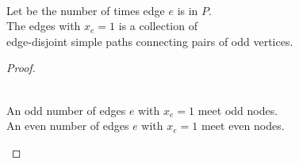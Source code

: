 \begin{frame}
  \begin{lemma}
    \begin{center}
       \\[5pt]
      Let  be the number of times edge $e$ is in $P$. \\[8pt]

      The edges with $x_e = 1$ is a collection of \\ edge-disjoint simple paths connecting pairs of odd vertices.
    \end{center}
  \end{lemma}

  \pause
  \begin{proof}
    \begin{center}
       \\[6pt] \pause
      An odd number of edges $e$ with $x_e = 1$ meet odd nodes. \\[2pt]
      An even number of edges $e$ with $x_e = 1$ meet even nodes. \pause

    \end{center}
  \end{proof}
\end{frame}
